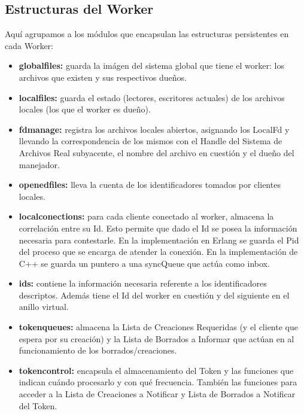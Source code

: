 \documentclass[12pt]{article}
\begin{document}
\subsection{Estructuras del Worker}
Aquí agrupamos a los módulos que encapsulan las estructuras persistentes en cada Worker:
\begin{itemize}
\item \textbf{globalfiles:} guarda la imágen del sistema global que tiene el worker: los archivos que existen y sus respectivos dueños.
\item \textbf{localfiles:} guarda el estado (lectores, escritores actuales) de los archivos locales (los que el worker es dueño).
\item \textbf{fdmanage:} registra los archivos locales abiertos, asignando los LocalFd y llevando la correspondencia de los mismos con el Handle del Sistema de Archivos Real subyacente, el nombre del archivo en cuestión y el dueño del manejador.
\item \textbf{openedfiles:} lleva la cuenta de los identificadores tomados por clientes locales.
\item \textbf{localconections:} para cada cliente conectado al worker, almacena la correlación entre su Id. Esto permite que dado el Id se posea la información necesaria para contestarle. En la implementación en Erlang se guarda el Pid del proceso que se encarga de atender la conexión. En la implementación de C++ se guarda un puntero a una syncQueue que actúa como inbox.
\item \textbf{ids:} contiene la información necesaria referente a los identificadores descriptos. Además tiene el Id del worker en cuestión y del siguiente en el anillo virtual.
\item \textbf{tokenqueues:} almacena la Lista de Creaciones Requeridas (y el cliente que espera por su creación) y la Lista de Borrados a Informar que actúan en al funcionamiento de los borrados/creaciones.
\item \textbf{tokencontrol:} encapsula el almacenamiento del Token y las funciones que indican cuándo procesarlo y con qué frecuencia. También las funciones para acceder a la Lista de Creaciones a Notificar y Lista de Borrados a Notificar del Token.
\end{itemize}
\end{document}
